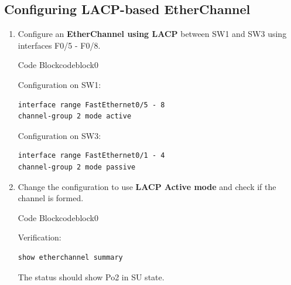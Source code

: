 \documentclass[a4paper]{article}
\begin{document}
\subsection{Configuring LACP-based EtherChannel}
\begin{enumerate}
	\item Configure an \textbf{EtherChannel using LACP} between SW1 and SW3 using interfaces F0/5 - F0/8.


	      \begin{ocg}{Code Block}{codeblock}{0}

		      \vspace{0.5cm}
		      Configuration on SW1:
		      \begin{lstlisting}
interface range FastEthernet0/5 - 8
channel-group 2 mode active
\end{lstlisting}

		      \vspace{0.5cm}
		      Configuration on SW3:
		      \begin{lstlisting}[columns=fullflexible]
interface range FastEthernet0/1 - 4
channel-group 2 mode passive

\end{lstlisting}

	      \end{ocg}


	\item Change the configuration to use \textbf{LACP Active mode} and check if the channel is formed.


	      \begin{ocg}{Code Block}{codeblock}{0}

		      \vspace{0.5cm}
		      Verification:
		      \begin{lstlisting}
show etherchannel summary
\end{lstlisting}

		      \begin{tcolorbox}
			      The status should show Po2 in SU state.
		      \end{tcolorbox}
		      \vspace{0.5cm}
	      \end{ocg}


\end{enumerate}
\end{document}

